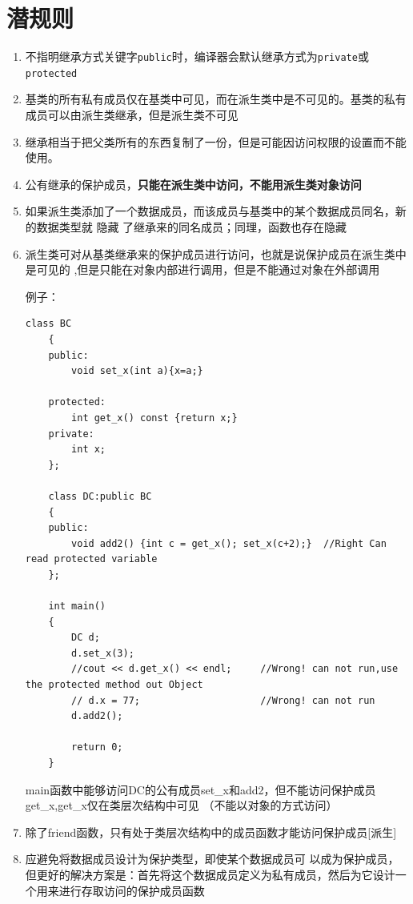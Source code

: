 \documentclass[UTF8,a4paper,12pt]{ctexbook} %
\begin{document}
\section{潜规则}
	       \begin{enumerate}[fullwidth,itemindent=2em,label=(\arabic*)]
	       	\item   不指明继承方式关键字\verb|public|时，编译器会默认继承方式为\verb|private|或\verb|protected|
	       	\item   基类的所有私有成员仅在基类中可见，而在派生类中是不可见的。基类的私有成员可以由派生类继承，但是派生类不可见
	       	\item   继承相当于把父类所有的东西复制了一份，但是可能因访问权限的设置而不能使用。
	       	\item   公有继承的保护成员，\textbf{只能在派生类中访问，不能用派生类对象访问}
	       	\item   如果派生类添加了一个数据成员，而该成员与基类中的某个数据成员同名，新的数据类型就  隐藏  了继承来的同名成员；同理，函数也存在隐藏
	       	\item   派生类可对从基类继承来的保护成员进行访问，也就是说保护成员在派生类中是可见的 ,但是只能在对象内部进行调用，但是不能通过对象在外部调用
	       	
	       	例子：
		       	 \begin{lstlisting}[language={[ANSI]C++}]
	class BC
	{
	public:
		void set_x(int a){x=a;}
	
	protected:
		int get_x() const {return x;}
	private:
		int x;
	};
	
	class DC:public BC
	{
	public:
		void add2() {int c = get_x(); set_x(c+2);}  //Right Can read protected variable
	};
	
	int main()
	{
		DC d;
		d.set_x(3);
		//cout << d.get_x() << endl;     //Wrong! can not run,use the protected method out Object
		// d.x = 77;                     //Wrong! can not run
		d.add2();
		
		return 0;
	}	       	
		       	\end{lstlisting}
	       \qquad \color{blue}	{main函数中能够访问DC的公有成员set\_x和add2，但不能访问保护成员get\_x,get\_x仅在类层次结构中可见 （不能以对象的方式访问）}
	       
	       \color{black}  \item  {除了friend函数，只有处于类层次结构中的成员函数才能访问保护成员[派生]}
	     
	       \item 应避免将数据成员设计为保护类型，即使某个数据成员可 以成为保护成员，但更好的解决方案是：首先将这个数据成员定义为私有成员，然后为它设计一个用来进行存取访问的保护成员函数
	      

\end{enumerate}
\end{document}
